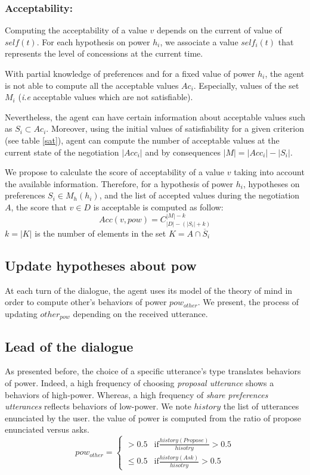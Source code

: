 \documentclass[conference, letterpaper]{IEEEtran}
\begin{document}
\subsubsection{Acceptability:}
Computing the acceptability of a value $v$ depends on the current of value of $self(t)$. For each hypothesis on power $h_i$, we associate a value $self_i(t)$ that represents the level of concessions at the current time. 

With partial knowledge of preferences and for a fixed value of power $h_i$, the agent is not able to compute all the acceptable values $Ac_i$. Especially,   values of the set $M_i$ (\emph{i.e} acceptable values which are not satisfiable). 

Nevertheless, the agent can have certain information about acceptable values such as $ S_i \subset Ac_i$. Moreover, using the initial values of satisfiability for a given criterion (see table \ref{sat}), agent can compute the number of acceptable values at the current state of the negotiation $|Acc_i|$ and by consequences $|M| = |Acc_i| - |S_i|$. 

We propose to calculate the score of acceptability of a value $v$ taking into account the available information. Therefore, for a hypothesis of power $h_i$, hypotheses on preferences $S_i \in M_h(h_i)$,  and the list of accepted values during the negotiation $A$, the score that $v \in D$ is acceptable is computed as follow: 
\begin{equation}
Acc(v, pow) = C_{|D|-(|S_i| + k)}^{|M| - k}
\end{equation}
$k = |K| $ is the number of elements in the set $K = A \cap \overline S_i$



\subsection{Update hypotheses about pow}
At each turn of the dialogue, the agent uses its model of the theory of mind in order to compute other's behaviors of power $pow_{other}$. We present, the process of updating $other_{pow}$ depending on the received utterance. 
\subsection{Lead of the dialogue}		
As presented before, the choice of a specific utterance's type translates behaviors of power. Indeed, a high frequency of choosing \emph{proposal utterance} shows a behaviors of high-power. Whereas, a high frequency of \emph{share preferences utterances} reflects behaviors of low-power.
We note $history$ the list of utterances enunciated by the user. the value of power is computed from the ratio of propose enunciated versus asks.
\begin{equation}
pow_{other} = \left\{\begin{array}{ll}
> 0.5 & \mathrm{if } \frac{history(Propose)}{hisotry} > 0.5\\
\leq 0.5 & \mathrm{if  } \frac{history(Ask)}{hisotry} > 0.5
\end{array}\right.
\end{equation}
\end{document}
